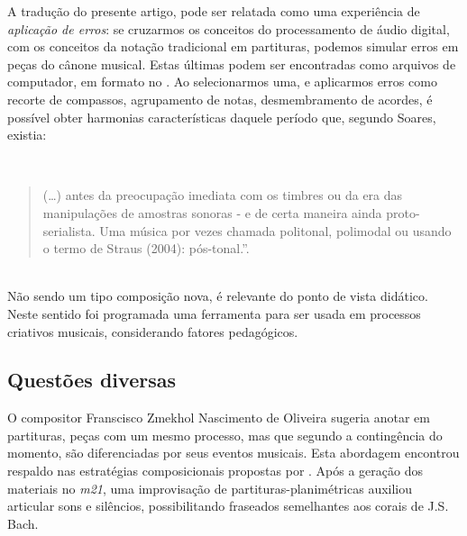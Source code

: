 A tradução do presente artigo, pode ser relatada como uma experiência de \emph{aplicação de erros}: se cruzarmos os conceitos do processamento de áudio digital, com os conceitos da notação tradicional em partituras, podemos simular erros em peças do cânone musical. Estas últimas podem ser encontradas como arquivos de computador, em formato \cite{musicxml_2015} no \cite{music21_2015}. Ao selecionarmos uma, e aplicarmos erros como recorte de compassos, agrupamento de notas, desmembramento de acordes, é possível obter harmonias características daquele período que, segundo Soares, existia:

\ \\
\begin{quote}
(\ldots) antes da preocupação imediata com os timbres ou da era das manipulações de amostras sonoras - e de certa maneira ainda proto-serialista. Uma música por vezes chamada politonal, polimodal ou usando o termo de Straus (2004): pós-tonal.''.\cite[p.~18]{soares_luteria_2015}
\end{quote}
\ \\

Não sendo um tipo composição nova, é relevante do ponto de vista didático. Neste sentido foi programada uma ferramenta para ser usada em processos criativos musicais, considerando fatores pedagógicos.

\subsection*{Questões diversas}

O compositor Franscisco Zmekhol Nascimento de Oliveira sugeria anotar em partituras, peças com um mesmo processo, mas que segundo a contingência do momento, são diferenciadas por seus eventos musicais. Esta abordagem encontrou respaldo nas estratégias composicionais propostas por \cite{koellreutter_introducao_1987}. Após a geração dos materiais no \emph{m21}, uma improvisação de partituras-planimétricas auxiliou articular sons e silêncios, possibilitando fraseados  semelhantes aos corais de J.S. Bach.


